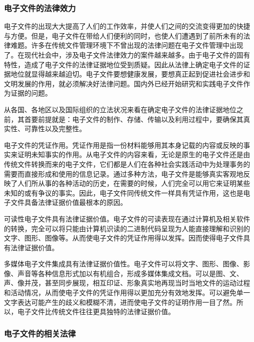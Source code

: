     \subsubsection {电子文件的法律效力}

    电子文件的出现大大提高了人们的工作效率，并使人们之间的交流变得更加的快捷与方便。但是，电子文件在带给人们便利的同时，也使人们遭遇到了前所未有的法律难题。许多在传统文件管理环境下不曾出现的法律问题在电子文件管理中出现了。在现代社会中，涉及电子文件法律效力的案件越来越多。由于电子文件的固有特性，造成了电子文件的法律证据地位受到质疑。因此从法律上确定电子文件的证据地位就显得越来越迫切。电子文件要想健康发展，要想真正起到促进社会进步和文明发展的作用，就必须解决好法律问题。国内外已经开始研究和实践电子文件作为证据的问题。

    从各国、各地区以及国际组织的立法状况来看在确定电子文件的法律证据地位之前，其首要前提就是：电子文件的制作、存储、传输以及利用过程中，要确保其真实性、可靠性以及完整性。

    \begin{enumerate.zh}
        \item 电子文件的凭证作用。凭证作用是指一份材料能够用其本身记载的内容或反映的事实来证明未知事实的作用。从电子文件的内容来看，无论是原生的电子文件还是由传统文件转换而来的电子文件，它们都是人们在各种社会实践活动中为处理事务的需要而直接形成和使用的信息记录。通过多种方法，电子文件是能够真实客观地反映了人们所从事的各种活动的历史，在需要的时候，人们完全可以用它来证明某些未知的或有争议的事实。因此，电子文件同传统文件一样具有凭证作用，这也是电子文件具备法律证据价值最根本的原因。

        \item 可读性电子文件具有法律证据价值。电子文件的可读表现在通过计算机及相关软件的转换，完全可以将只能由计算机识读的二进制代码呈现为人能直接理解和识别的文字、图形、图像等。从而使电子文件的凭证作用得以发挥。因而使得电子文件具有法律证据价值。

        \item 多媒体电子文件集成具有法律证据价值性。电子文件可以将文字、图形、图像、影像、声音等各种信息形式加以有机组合，形成多媒体集成文档。可以是图、文、声、像并茂，甚至同步展现，相互印证、形象真实地再现当时当地文件的运动过程和活动情况，从而使电子文件的凭证作用得以更加充分有效地发挥。可以避免单一文字表达可能产生的歧义和模糊不清，进而使电子文件的证明作用一目了然。所以，电子文件比传统文件往往更具独特的法律证据价值。
    \end{enumerate.zh}

    \subsubsection {电子文件的相关法律}

